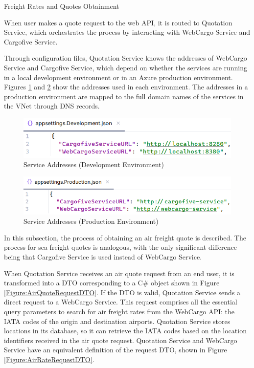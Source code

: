 \documentclass[12pt, reqno, oneside]{amsbook}
\makeatletter
\def\subsection{\@startsection{subsection}{2}%
      \z@{.5\linespacing\@plus.7\linespacing}{.25\linespacing}%
      {\normalfont\bfseries\flushleft}}
\theoremstyle{definition}
\theoremstyle{definition}
\numberwithin{section}{chapter}
\numberwithin{table}{chapter}
\numberwithin{figure}{chapter}
\makeatother
\begin{document}
\pagebreak

\subsection{Freight Rates and Quotes Obtainment}
\label{Subsection:Freight_Rates_And_Quotes_Obtainment}

When user makes a quote request to the web \ac{API}, it is routed to Quotation Service, which orchestrates the process by interacting with WebCargo Service and Cargofive Service.

Through configuration files, Quotation Service knows the addresses of WebCargo Service and Cargofive Service, which depend on whether the services are running in a local development environment or in an Azure production environment. Figures \ref{Figure:ServiceAddressesDevelopment} and \ref{Figure:ServiceAddressesProduction} show the addresses used in each environment. The addresses in a production environment are mapped to the full domain names of the services in the \ac{VNet} through \ac{DNS} records.

\begin{figure}[H]
  \centering
  \includegraphics[width=0.8\linewidth]{images/ServiceAddressesDevelopment.png}
  \caption{\label{Figure:ServiceAddressesDevelopment}Service Addresses (Development Environment)}
\end{figure}

\begin{figure}[H]
  \centering
  \includegraphics[width=0.8\linewidth]{images/ServiceAddressesProduction.png}
  \caption{\label{Figure:ServiceAddressesProduction}Service Addresses (Production Environment)}
\end{figure}

In this subsection, the process of obtaining an air freight quote is described. The process for sea freight quotes is analogous, with the only significant difference being that Cargofive Service is used instead of WebCargo Service.

When Quotation Service receives an air quote request from an end user, it is transformed into a \ac{DTO} corresponding to a C\# object shown in Figure \ref{Figure:AirQuoteRequestDTO}. If the \ac{DTO} is valid, Quotation Service sends a direct request to a WebCargo Service. This request comprises all the essential query parameters to search for air freight rates from the WebCargo \ac{API}: the \ac{IATA} codes of the origin and destination airports. Quotation Service stores locations in its database, so it can retrieve the \ac{IATA} codes based on the location identifiers received in the air quote request. Quotation Service and WebCargo Service have an equivalent definition of the request \ac{DTO}, shown in Figure \ref{Figure:AirRateRequestDTO}.
\end{document}
